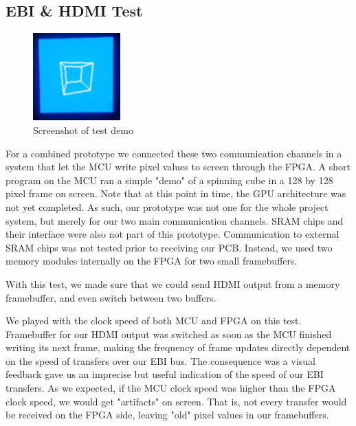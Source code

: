 \subsection{EBI \& HDMI Test}

\begin{figure}
\centering
\includegraphics[width=0.3\textwidth]{diagrams/prototype_demo.png}
\caption{Screenshot of test demo}
\label{prototype_demo}
\end{figure}

For a combined prototype we connected these two communication channels in a system that let the MCU write pixel values to screen through the FPGA.
A short program on the MCU ran a simple "demo" of a spinning cube in a 128 by 128 pixel frame on screen.
Note that at this point in time, the GPU architecture was not yet completed.
As such, our prototype was not one for the whole project system, but merely for our two main communication channels.
SRAM chips and their interface were also not part of this prototype.
Communication to external SRAM chips was not tested prior to receiving our PCB.
Instead, we used two memory modules internally on the FPGA for two small framebuffers.

With this test, we made sure that we could send HDMI output from a memory framebuffer, and even switch between two buffers. 

We played with the clock speed of both MCU and FPGA on this test.
Framebuffer for our HDMI output was switched as soon as the MCU finished writing its next frame, making the frequency of frame updates directly dependent on the speed of transfers over our EBI bus.
The consequence was a visual feedback gave us an imprecise but useful indication of the speed of our EBI transfers.
As we expected, if the MCU clock speed was higher than the FPGA clock speed, we would get "artifacts" on screen.
That is, not every transfer would be received on the FPGA side, leaving "old" pixel values in our framebuffers.
